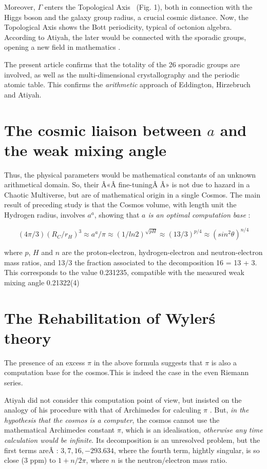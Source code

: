 \documentclass[a4paper,9pt]{article}
\begin{document}
   
     Moreover, $\Gamma$ enters the Topological Axis \cite{Sanchez} \ (Fig. 1), both in connection with the Higgs boson and the galaxy group radius, a crucial cosmic distance. Now, the Topological Axis shows the Bott periodicity, typical of octonion algebra. According to Atiyah, the later would be connected with the sporadic groups, opening a new field in mathematics \cite{Atiyah1}.
     
     
     The present article confirms that the totality of the 26 sporadic groups are involved, as well as the multi-dimensional crystallography and the periodic atomic table. This confirms the \textit {arithmetic} approach of Eddington, Hirzebruch and Atiyah.

\section{The cosmic liaison between $a$ and the weak mixing angle}

Thus, the physical parameters would be mathematical constants of an unknown arithmetical domain. So, their Â«Â fine-tuningÂ Â» is not due to hazard in a Chaotic Multiverse, but are of mathematical origin in a single Cosmos. The main result of preceding study is that the Cosmos volume, with length unit the Hydrogen radius, involves $a^a$, showing that \textit{$a$ is an optimal computation base}  \cite{Sanchez}:

\begin{equation}
    (4\pi /3) (R_C/r_H)^3 \approx a^a/\pi \approx (1/ln2)^{\sqrt{pH}} \approx (13/3)^{p/4} \approx (sin^2\theta)^{n/4} 
\end{equation}

where $p$, $H$ and $n$ are the proton-electron, hydrogen-electron and neutron-electron mass ratios, and 13/3 the fraction associated to the decomposition 16 = 13 + 3. This corresponds to the value 0.231235, compatible with the measured weak mixing angle 0.21322(4) \cite{Tanabashi}
  
\section{The Rehabilitation of Wyler\'s theory}
The presence of an excess $\pi$ in the above formula suggests that $\pi$ is also a computation base for the cosmos.This is indeed the case in the even Riemann series.


Atiyah did not consider this computation point of view, but insisted on the analogy of his procedure with that of Archimedes for calculing $\pi$ \cite{Atiyah}. But, \textit {in the hypothesis that the cosmos is a computer}, the cosmos cannot use the mathematical Archimedes constant $\pi$, which is an idealisation, \textit {otherwise any time calculation would be infinite}. Its decomposition is an unresolved problem, but the first terms areÂ : $3, 7, 16, -293.634$, where the fourth term, hightly singular, is so close (3 ppm) to $1 + n/2\pi$, where $n$ is the neutron/electron mass ratio.
\end{document}
